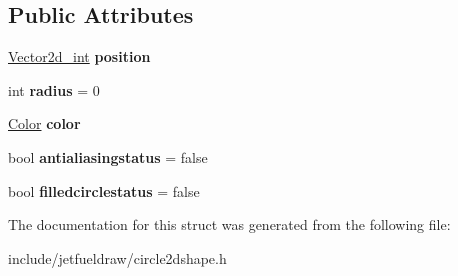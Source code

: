 \subsection*{Public Attributes}
\begin{DoxyCompactItemize}
\item 
\mbox{\label{structjetfuel_1_1draw_1_1Circle__2d__shape_1_1Circle__2d__shape__characteristics_a803262245b8b2213ef89ccb5b4924a81}} 
\hyperlink{classjetfuel_1_1draw_1_1Vector2d}{Vector2d\+\_\+int} {\bfseries position}
\item 
\mbox{\label{structjetfuel_1_1draw_1_1Circle__2d__shape_1_1Circle__2d__shape__characteristics_a6f14b4f3bb802098bc0f2833d26253ae}} 
int {\bfseries radius} = 0
\item 
\mbox{\label{structjetfuel_1_1draw_1_1Circle__2d__shape_1_1Circle__2d__shape__characteristics_a852915bdc0361e5d7bd4b21b66bcee72}} 
\hyperlink{classjetfuel_1_1draw_1_1Color}{Color} {\bfseries color}
\item 
\mbox{\label{structjetfuel_1_1draw_1_1Circle__2d__shape_1_1Circle__2d__shape__characteristics_a5ff35e007125e6f0ed97dcc43532a756}} 
bool {\bfseries antialiasingstatus} = false
\item 
\mbox{\label{structjetfuel_1_1draw_1_1Circle__2d__shape_1_1Circle__2d__shape__characteristics_ae4f99c0c5abaa938d89e87aa4d70a6b4}} 
bool {\bfseries filledcirclestatus} = false
\end{DoxyCompactItemize}


The documentation for this struct was generated from the following file\+:\begin{DoxyCompactItemize}
\item 
include/jetfueldraw/circle2dshape.\+h\end{DoxyCompactItemize}
